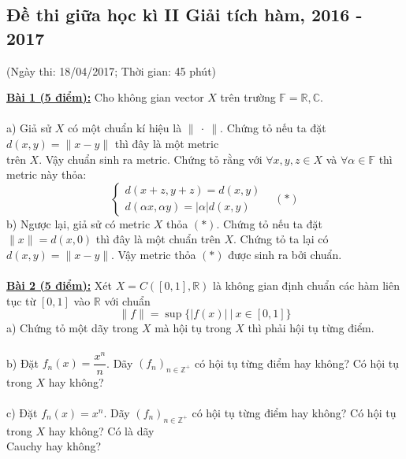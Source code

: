 \documentclass[10pt, a4paper]{article}
\begin{document}
\subsection{Đề thi giữa học kì II Giải tích hàm, 2016 - 2017}
\begin{center}
	\color{blue}(Ngày thi: 18/04/2017; Thời gian: 45 phút)
\end{center}
\color{red}\underline{\textbf{Bài 1 (5 điểm):}} \color{black} Cho không gian vector $X$ trên trường $\mathbb F=\mathbb R,\mathbb C$.\\\\
\color{red}a) \color{black}Giả sử $X$ có một chuẩn kí hiệu là $\lVert~\cdot~\rVert.$ Chứng tỏ nếu ta đặt $d(x,y)=\lVert x-y\rVert$ thì đây là một metric\\ trên $X$. Vậy chuẩn sinh ra metric. Chứng tỏ rằng với $\forall x,y,z\in X$ và $\forall\alpha\in\mathbb F$ thì metric này thỏa: $$\begin{cases}
	d(x+z,y+z)=d(x,y)\\
	d(\alpha x,\alpha y)=|\alpha|d(x,y)
\end{cases}~~~~(*)$$
\color{red}b) \color{black}Ngược lại, giả sử có metric $X$ thỏa $(*)$. Chứng tỏ nếu ta đặt $\lVert x\rVert=d(x,0)$ thì đây là một chuẩn trên $X$. Chứng tỏ ta lại có $d(x,y)=\lVert x-y\rVert$. Vậy metric thỏa $(*)$ được sinh ra bởi chuẩn.\\\\
\color{red}\underline{\textbf{Bài 2 (5 điểm):}} \color{black}Xét $X=C([0,1],\mathbb R)$ là không gian định chuẩn các hàm liên tục từ $[0,1]$ vào $\mathbb R$ với chuẩn $$\lVert f\rVert=\sup\{|f(x)|~|~x\in[0,1]\}$$
\color{red}a) \color{black}Chứng tỏ một dãy trong $X$ mà hội tụ trong $X$ thì phải hội tụ từng điểm.\\\\
\color{red}b) \color{black}Đặt $f_n(x)=\dfrac{x^n}{n}$. Dãy $(f_n)_{n\in\mathbb Z^+}$ có hội tụ từng điểm hay không? Có hội tụ trong $X$ hay không?\\\\
\color{red}c) \color{black}Đặt $f_n(x)=x^n$. Dãy $(f_n)_{n\in\mathbb Z^+}$ có hội tụ từng điểm hay không? Có hội tụ trong $X$ hay không? Có là dãy\\ Cauchy hay không?

\newpage
\end{document}
